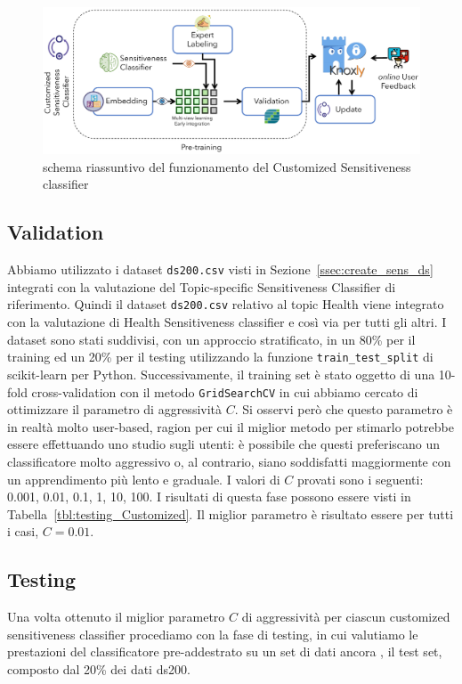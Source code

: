 \begin{figure}[h]
    \centering
    \includegraphics[width=15cm]{Figure/grafici/customized_cropped.pdf}
    \caption{schema riassuntivo del funzionamento del Customized Sensitiveness classifier}
    \label{fig:approccisensCustomized}
\end{figure}
\FloatBarrier

\subsection{Validation}
Abbiamo utilizzato i dataset {\tt ds200.csv} visti in Sezione~\ref{ssec:create_sens_ds} integrati con la valutazione del Topic-specific Sensitiveness Classifier di riferimento. Quindi il dataset {\tt ds200.csv} relativo al topic Health viene integrato con la valutazione di Health Sensitiveness classifier e così via per tutti gli altri.
I dataset sono stati suddivisi, con un approccio stratificato, in un 80\% per il training ed un 20\% per il testing utilizzando la funzione {\tt train\_test\_split} di scikit-learn per Python. Successivamente, il training set è stato oggetto di una 10-fold cross-validation con il metodo {\tt GridSearchCV} in cui abbiamo cercato di ottimizzare il parametro di aggressività $C$. Si osservi però che questo parametro è in realtà molto user-based, ragion per cui il miglior metodo per stimarlo potrebbe essere effettuando uno studio sugli utenti: è possibile che questi preferiscano un classificatore molto aggressivo o, al contrario, siano soddisfatti maggiormente con un apprendimento più lento e graduale. I valori di $C$ provati sono i seguenti: 0.001, 0.01, 0.1, 1, 10, 100. I risultati di questa fase possono essere visti in Tabella~\ref{tbl:testing_Customized}. Il miglior parametro è risultato essere per tutti i casi, $C=0.01$.

\subsection{Testing}
Una volta ottenuto il miglior parametro $C$ di aggressività per ciascun customized sensitiveness classifier procediamo con la fase di testing, in cui valutiamo le prestazioni del classificatore pre-addestrato su un set di dati ancora , il test set, composto dal 20\% dei dati ds200.

